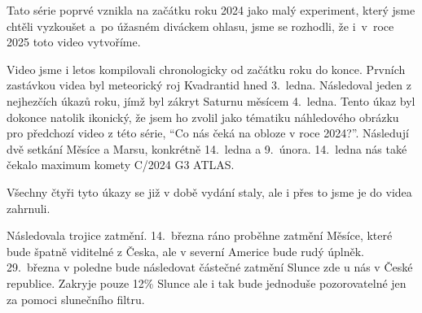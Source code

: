 \documentclass[12pt,a4paper,titlepage]{article}
\begin{document}
Tato série poprvé vznikla na začátku roku 2024 jako malý experiment, který jsme chtěli vyzkoušet a~po úžasném diváckem ohlasu, jsme se rozhodli, že i~v~roce 2025 toto video vytvoříme.

Video jsme i letos kompilovali chronologicky od začátku roku do konce. Prvních zastávkou videa byl meteorický roj Kvadrantid hned 3.\ ledna. Následoval jeden z nejhezčích úkazů roku, jímž byl zákryt Saturnu měsícem 4.\ ledna. Tento úkaz byl dokonce natolik ikonický, že jsem ho zvolil jako tématiku náhledového obrázku pro předchozí video z této série, \enquote{Co nás čeká na obloze v roce 2024?}. Následují dvě setkání Měsíce a Marsu, konkrétně 14.\ ledna a 9.\ února. 14.\ ledna nás také čekalo maximum komety C/2024 G3 ATLAS.\@

Všechny čtyři tyto úkazy se již v době vydání staly, ale i přes to jsme je do videa zahrnuli.

Následovala trojice zatmění. 14.\ března ráno proběhne zatmění Měsíce, které bude špatně viditelné z Česka, ale v severní Americe bude rudý úplněk. 29.\ března v poledne bude následovat částečné zatmění Slunce zde u nás v České republice. Zakryje pouze 12\% Slunce ale i tak bude jednoduše pozorovatelné jen za pomoci slunečního filtru.
\end{document}
